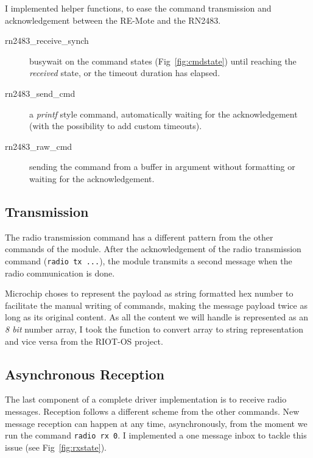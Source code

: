 
I implemented helper functions, to ease the command transmission and
acknowledgement between the RE-Mote and the RN2483.

\begin{description}
  \item[rn2483\_receive\_synch] busywait on the command states
    (Fig~\ref{fig:cmdstate}) until reaching the \emph{received} state, 
    or the timeout duration has elapsed.
  \item[rn2483\_send\_cmd] a \emph{printf} style command, automatically 
    waiting for the acknowledgement (with the possibility to add custom timeouts).
  \item[rn2483\_raw\_cmd] sending the command from a buffer in argument
    without formatting or waiting for the acknowledgement.
\end{description}



\subsection{Transmission}

The radio transmission command has a different pattern from the other commands 
of the module. 
After the acknowledgement of the radio transmission command (\lstinline{radio tx ...}),
the module transmits a second message when the radio communication is done.



Microchip choses to represent the payload as string formatted hex number to
facilitate the manual writing of commands, making the message payload twice as
long as its original content. 
As all the content we will handle is represented as an \emph{8 bit} number array, 
I took the function to convert array to string representation and vice versa
from the RIOT-OS project.

\subsection{Asynchronous Reception}

The last component of a complete driver implementation is to receive radio
messages.
Reception follows a different scheme from the other commands. 
New message reception can happen at any time, asynchronously, from the moment
we run the command \lstinline{radio rx 0}.
I implemented a one message inbox to tackle this issue (see Fig~\ref{fig:rxstate}).

